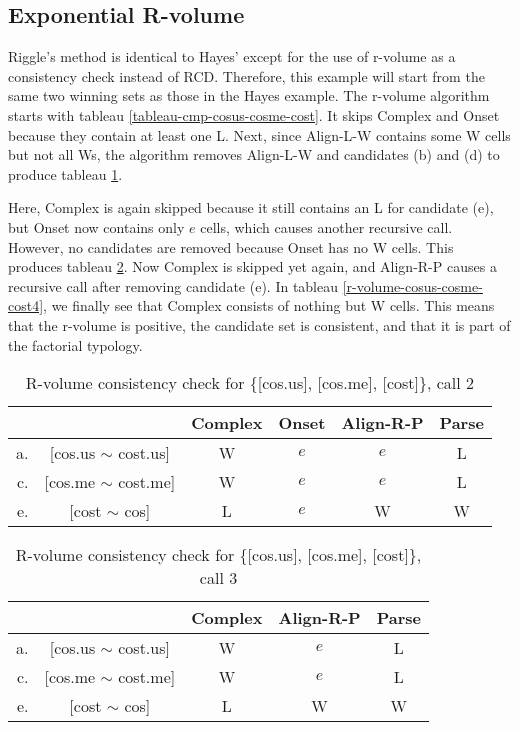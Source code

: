\documentclass[11pt]{article}
\begin{document}
\subsection{Exponential R-volume}

Riggle's method is identical to Hayes' except for the use of r-volume
as a consistency check instead of RCD. Therefore, this example will
start from the same two winning sets as those in the Hayes
example. The r-volume algorithm starts with
tableau \ref{tableau-cmp-cosus-cosme-cost}. It skips
{\sc *Complex} and {\sc Onset} because they contain at least one
L. Next, since {\sc Align-L-W} contains some W cells but not all Ws,
the algorithm removes {\sc Align-L-W} and candidates (b) and (d) to
produce tableau \ref{r-volume-cosus-cosme-cost2}.

Here, {\sc *Complex} is again skipped because it still contains an L for
candidate (e), but {\sc Onset} now contains
only $e$ cells, which causes another recursive call. However, no candidates
are removed because {\sc Onset} has no W cells. This produces tableau
\ref{r-volume-cosus-cosme-cost3}. Now {\sc *Complex} is skipped yet
again, and {\sc Align-R-P} causes a recursive call after removing
candidate (e). In tableau \ref{r-volume-cosus-cosme-cost4}, we finally
see that {\sc *Complex} consists of nothing but W cells. This means
that the r-volume is positive, the candidate set is consistent, and
that it is part of the factorial typology.

\begin{table}
\begin{tabular}{|rc||c|c|c|c|}\hline
 && {\sc *Complex} & {\sc Onset} & {\sc Align-R-P} & {\sc Parse} \\ \hline\hline
 a. & [cos.us $\sim$ cost.us] & W & $e$ &$e$  & L\\ \hline
 c. & [cos.me $\sim$ cost.me] & W&$e$ & $e$& L\\ \hline
 e. & [cost $\sim$ cos]            &L &$e$&W   & W \\ \hline
\end{tabular}
  \caption{R-volume consistency check for \{[cos.us], [cos.me], [cost]\}, call 2}
  \label{r-volume-cosus-cosme-cost2}
\end{table}

\begin{table}
\begin{tabular}{|rc||c|c|c|}\hline
 && {\sc *Complex} &  {\sc Align-R-P} & {\sc Parse} \\ \hline\hline
 a. & [cos.us $\sim$ cost.us] & W &$e$  & L\\ \hline
 c. & [cos.me $\sim$ cost.me] & W& $e$& L\\ \hline
 e. & [cost $\sim$ cos]            &L &W   & W \\ \hline
\end{tabular}
  \caption{R-volume consistency check for \{[cos.us], [cos.me],
    [cost]\}, call 3}
  \label{r-volume-cosus-cosme-cost3}
\end{table}
\end{document}
